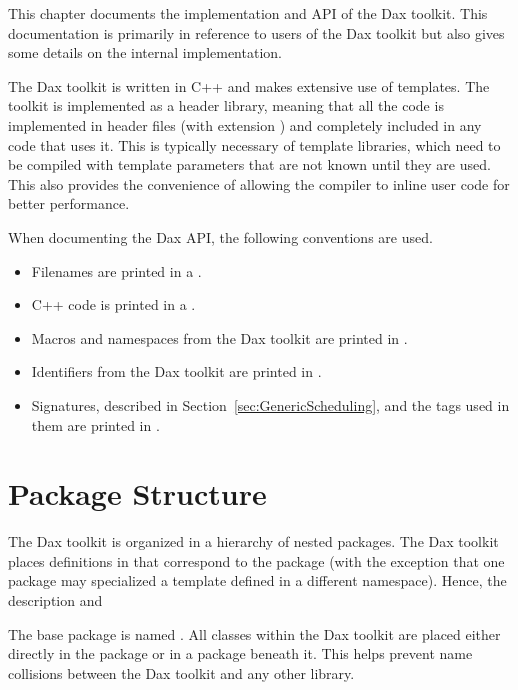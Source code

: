 
This chapter documents the implementation and API of the Dax toolkit. This
documentation is primarily in reference to users of the Dax toolkit but
also gives some details on the internal implementation.

The Dax toolkit is written in C++ and makes extensive use of templates. The
toolkit is implemented as a header library, meaning that all the code is
implemented in header files (with extension ) and
completely included in any code that uses it. This is typically necessary
of template libraries, which need to be compiled with template parameters
that are not known until they are used. This also provides the convenience
of allowing the compiler to inline user code for better performance.

When documenting the Dax API, the following conventions are used.
\begin{itemize}
\item Filenames are printed in a .
\item C++ code is printed in a .
\item Macros and namespaces from the Dax toolkit are printed
  in .
\item Identifiers from the Dax toolkit are printed in
  .
\item Signatures, described in Section~\ref{sec:GenericScheduling}, and the
  tags used in them are printed in .
\end{itemize}

\section{Package Structure}
\label{sec:PackageStructure}


The Dax toolkit is organized in a hierarchy of nested packages. The Dax
toolkit places definitions in   that
correspond to the package (with the exception that one package may
specialized a template defined in a different namespace). Hence, the
description and

The base package is named \dax{}. All classes within the Dax toolkit are
placed either directly in the \dax{} package or in a package beneath
it. This helps prevent name collisions between the Dax toolkit and any
other library.

